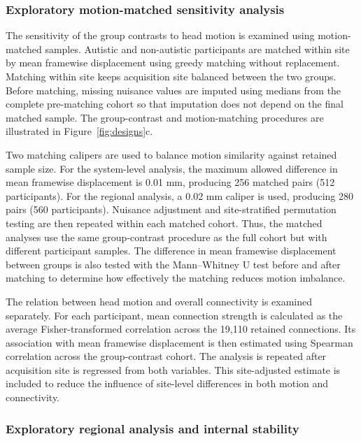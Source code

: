 \subsubsection{Exploratory motion-matched sensitivity analysis}
\label{subsubsec:motion-matching}

The sensitivity of the group contrasts to head motion is examined using motion-matched samples. Autistic and non-autistic participants are matched within site by mean framewise displacement using greedy matching without replacement. Matching within site keeps acquisition site balanced between the two groups. Before matching, missing nuisance values are imputed using medians from the complete pre-matching cohort so that imputation does not depend on the final matched sample. The group-contrast and motion-matching procedures are illustrated in Figure~\ref{fig:designs}c.

Two matching calipers are used to balance motion similarity against retained sample size. For the system-level analysis, the maximum allowed difference in mean framewise displacement is 0.01 mm, producing 256 matched pairs (512 participants). For the regional analysis, a 0.02 mm caliper is used, producing 280 pairs (560 participants). Nuisance adjustment and site-stratified permutation testing are then repeated within each matched cohort. Thus, the matched analyses use the same group-contrast procedure as the full cohort but with different participant samples. The difference in mean framewise displacement between groups is also tested with the Mann--Whitney U test before and after matching to determine how effectively the matching reduces motion imbalance.

The relation between head motion and overall connectivity is examined separately. For each participant, mean connection strength is calculated as the average Fisher-transformed correlation across the 19,110 retained connections. Its association with mean framewise displacement is then estimated using Spearman correlation across the group-contrast cohort. The analysis is repeated after acquisition site is regressed from both variables. This site-adjusted estimate is included to reduce the influence of site-level differences in both motion and connectivity.

\subsubsection{Exploratory regional analysis and internal stability}
\label{subsubsec:regional-analysis}

